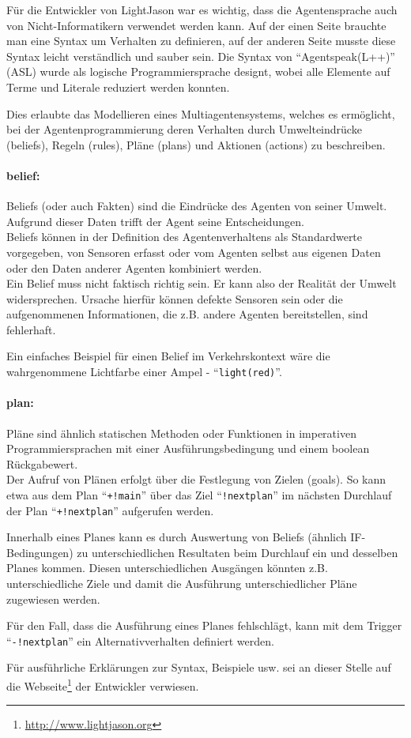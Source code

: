 Für die Entwickler von LightJason war es wichtig, dass die Agentensprache auch von Nicht-Informatikern verwendet werden kann.
Auf der einen Seite brauchte man eine Syntax um Verhalten zu definieren, auf der anderen Seite musste diese Syntax leicht verständlich und sauber sein.
Die Syntax von \enquote{Agentspeak(L++)} (ASL) wurde als logische Programmiersprache \mbox{designt}, wobei alle Elemente auf Terme und Literale reduziert werden konnten.

Dies erlaubte das Modellieren eines Multiagentensystems, welches es ermöglicht, bei der Agentenprogrammierung deren Verhalten durch Umwelteindrücke (beliefs), Regeln (rules), Pläne (plans) und Aktionen (actions) zu beschreiben.

\paragraph*{belief:}
Beliefs (oder auch Fakten) sind die Eindrücke des Agenten von seiner Umwelt.
Aufgrund dieser Daten trifft der Agent seine Entscheidungen.
\\
Beliefs können in der Definition des Agentenverhaltens als Standardwerte vorgegeben, von Sensoren erfasst oder vom Agenten selbst aus eigenen Daten oder den Daten anderer Agenten kombiniert werden.
\\
Ein Belief muss nicht faktisch richtig sein.
Er kann also der Realität der Umwelt widersprechen. 
Ursache hierfür können defekte Sensoren sein oder die aufgenommenen Informationen, die z.B. andere Agenten bereitstellen, sind fehlerhaft.

Ein einfaches Beispiel für einen Belief im Verkehrskontext wäre die wahrgenommene Lichtfarbe einer Ampel - \enquote{\texttt{light(red)}}.

\paragraph*{plan:}
Pläne sind ähnlich statischen Methoden oder Funktionen in imperativen Programmiersprachen mit einer Ausführungsbedingung und einem boolean Rückgabewert.
\\
Der Aufruf von Plänen erfolgt über die Festlegung von Zielen (goals).
So kann etwa aus dem Plan \enquote{\texttt{+!main}} über das Ziel \enquote{\texttt{!nextplan}} im nächsten Durchlauf der Plan \enquote{\texttt{+!nextplan}} aufgerufen werden.

Innerhalb eines Planes kann es durch Auswertung von Beliefs (ähnlich IF-Bedingungen) zu unterschiedlichen Resultaten beim Durchlauf ein und desselben Planes kommen.
Diesen unterschiedlichen Ausgängen könnten z.B. unterschiedliche Ziele und damit die Ausführung unterschiedlicher Pläne zugewiesen werden.

Für den Fall, dass die Ausführung eines Planes fehlschlägt, kann mit dem Trigger \enquote{\texttt{-!nextplan}} ein Alternativverhalten definiert werden.

\par\vspace{2.5em}
Für ausführliche Erklärungen zur Syntax, Beispiele usw. sei an dieser Stelle auf die Webseite\footnote{\url{http://www.lightjason.org}} der Entwickler verwiesen.
